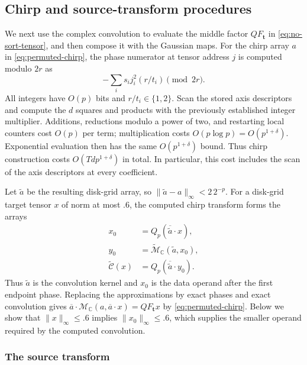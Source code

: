 \subsection{Chirp and source-transform procedures}

We next use the complex convolution to evaluate the middle factor
$QF_{\boldsymbol t}$ in \eqref{eq:no-sort-tensor}, and then compose it
with the Gaussian maps. For the chirp array $a$ in
\eqref{eq:permuted-chirp}, the phase numerator
at tensor address $j$ is computed modulo $2r$ as
\[
 -\sum_i s_i j_i^2(r/t_i)\pmod{2r}.
\]
All integers have $O(p)$ bits and $r/t_i\in\{1,2\}$.  Scan the stored
axis descriptors and compute the $d$ squares and products with the
previously established integer multiplier.  Additions, reductions
modulo a power of two, and restarting local counters cost $O(p)$ per
term; multiplication costs $O(p\log p)=O(p^{1+\delta})$.  Exponential
evaluation then has the same $O(p^{1+\delta})$ bound.  Thus chirp
construction costs $O(Td p^{1+\delta})$ in total.  In particular, this
cost includes the scan of the axis descriptors at every coefficient.

Let $\widetilde a$ be the resulting disk-grid array, so
$\|\widetilde a-a\|_\infty<2\,2^{-p}$.  For a disk-grid target tensor
$x$ of norm at most $.6$, the computed chirp transform forms the arrays
\[
 \begin{aligned}
 x_0&=Q_p(\overline{\widetilde a}\mathbin{\cdot}x),\\
 y_0&=\widetilde{\mathcal M}_{\mathbb C}(\widetilde a,x_0),\\
 \widetilde{\mathscr C}(x)
     &=Q_p(\overline{\widetilde a}\mathbin{\cdot}y_0).
 \end{aligned}
\]
Thus $\widetilde a$ is the convolution kernel and $x_0$ is the data
operand after the first endpoint phase.  Replacing the approximations
by exact phases and exact convolution gives
$\overline a\mathbin{\cdot}\mathcal M_{\mathbb C}
(a,\overline a\mathbin{\cdot}x)=QF_{\boldsymbol t}x$ by
\eqref{eq:permuted-chirp}.  Below we show that $\|x\|_\infty\le.6$
implies $\|x_0\|_\infty\le.6$, which supplies the smaller operand
required by the computed convolution.

\subsubsection{The source transform}

